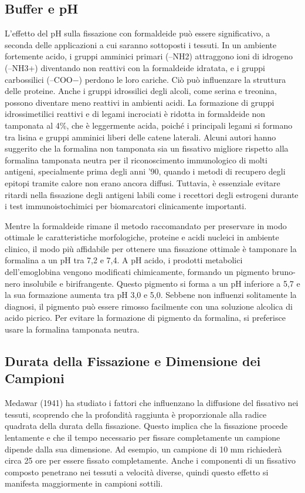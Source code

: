 \subsection{Buffer e pH}
L'effetto del pH sulla fissazione con formaldeide può essere significativo, a seconda delle applicazioni a cui saranno sottoposti i tessuti. In un ambiente fortemente acido, i gruppi amminici primari (–NH2) attraggono ioni di idrogeno (–NH3+) diventando non reattivi con la formaldeide idratata, e i gruppi carbossilici (–COO−) perdono le loro cariche. Ciò può influenzare la struttura delle proteine. Anche i gruppi idrossilici degli alcoli, come serina e treonina, possono diventare meno reattivi in ambienti acidi. La formazione di gruppi idrossimetilici reattivi e di legami incrociati è ridotta in formaldeide non tamponata al 4\%, che è leggermente acida, poiché i principali legami si formano tra lisina e gruppi amminici liberi delle catene laterali. Alcuni autori hanno suggerito che la formalina non tamponata sia un fissativo migliore rispetto alla formalina tamponata neutra per il riconoscimento immunologico di molti antigeni, specialmente prima degli anni '90, quando i metodi di recupero degli epitopi tramite calore non erano ancora diffusi. Tuttavia, è essenziale evitare ritardi nella fissazione degli antigeni labili come i recettori degli estrogeni durante i test immunoistochimici per biomarcatori clinicamente importanti.

Mentre la formaldeide rimane il metodo raccomandato per preservare in modo ottimale le caratteristiche morfologiche, proteine e acidi nucleici in ambiente clinico, il modo più affidabile per ottenere una fissazione ottimale è tamponare la formalina a un pH tra 7,2 e 7,4. A pH acido, i prodotti metabolici dell'emoglobina vengono modificati chimicamente, formando un pigmento bruno-nero insolubile e birifrangente. Questo pigmento si forma a un pH inferiore a 5,7 e la sua formazione aumenta tra pH 3,0 e 5,0. Sebbene non influenzi solitamente la diagnosi, il pigmento può essere rimosso facilmente con una soluzione alcolica di acido picrico. Per evitare la formazione di pigmento da formalina, si preferisce usare la formalina tamponata neutra.

\subsection{Durata della Fissazione e Dimensione dei Campioni}
Medawar (1941) ha studiato i fattori che influenzano la diffusione del fissativo nei tessuti, scoprendo che la profondità raggiunta è proporzionale alla radice quadrata della durata della fissazione. Questo implica che la fissazione procede lentamente e che il tempo necessario per fissare completamente un campione dipende dalla sua dimensione. Ad esempio, un campione di 10 mm richiederà circa 25 ore per essere fissato completamente. Anche i componenti di un fissativo composto penetrano nei tessuti a velocità diverse, quindi questo effetto si manifesta maggiormente in campioni sottili.

